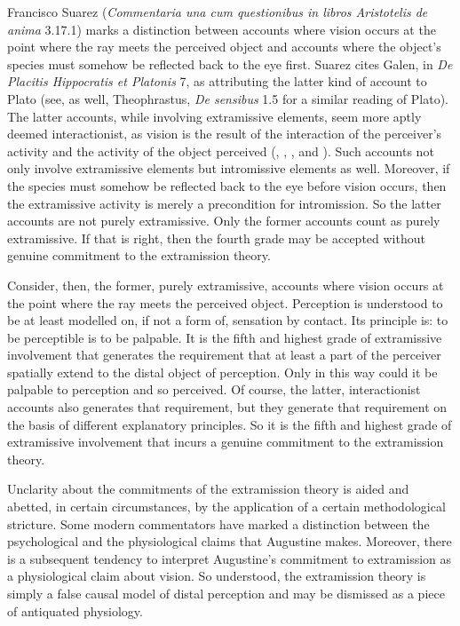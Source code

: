 \documentclass[12pt]{article}
\begin{document}
Francisco Suarez (\emph{Commentaria una cum questionibus in libros Aristotelis de anima} 3.17.1) marks a distinction between accounts where vision occurs at the point where the ray meets the perceived object and accounts where the object's species must somehow be reflected back to the eye first. Suarez cites Galen, in \emph{De Placitis Hippocratis et Platonis} 7, as attributing the latter kind of account to Plato (see, as well, Theophrastus, \emph{De sensibus} 1.5 for a similar reading of Plato). The latter accounts, while involving extramissive elements, seem more aptly deemed interactionist, as vision is the result of the interaction of the perceiver's activity and the activity of the object perceived (\citealt[22--23]{Smith:1996sh}, \citealt{Ierodiakonou:2005ly}, \citealt{Remes:2014en}, and \citealt{Squire:2016aa}). Such accounts not only involve extramissive elements but intromissive elements as well. Moreover, if the species must somehow be reflected back to the eye before vision occurs, then the extramissive activity is merely a precondition for intromission. So the latter accounts are not purely extramissive. Only the former accounts count as purely extramissive. If that is right, then the fourth grade may be accepted without genuine commitment to the extramission theory.

Consider, then, the former, purely extramissive, accounts where vision occurs at the point where the ray meets the perceived object. Perception is understood to be at least modelled on, if not a form of, sensation by contact. Its principle is: to be perceptible is to be palpable. It is the fifth and highest grade of extramissive involvement that generates the requirement that at least a part of the perceiver spatially extend to the distal object of perception. Only in this way could it be palpable to perception and so perceived. Of course, the latter, interactionist accounts also generates that requirement, but they generate that requirement on the basis of different explanatory principles. So it is the fifth and highest grade of extramissive involvement that incurs a genuine commitment to the extramission theory. 

Unclarity about the commitments of the extramission theory is aided and abetted, in certain circumstances, by the application of a certain methodological stricture. Some modern commentators have marked a distinction between the psychological and the physiological claims that Augustine makes. Moreover, there is a subsequent tendency to interpret Augustine's commitment to extramission as a physiological claim about vision. So understood, the extramission theory is simply a false causal model of distal perception and may be dismissed as a piece of antiquated physiology.
\end{document}

